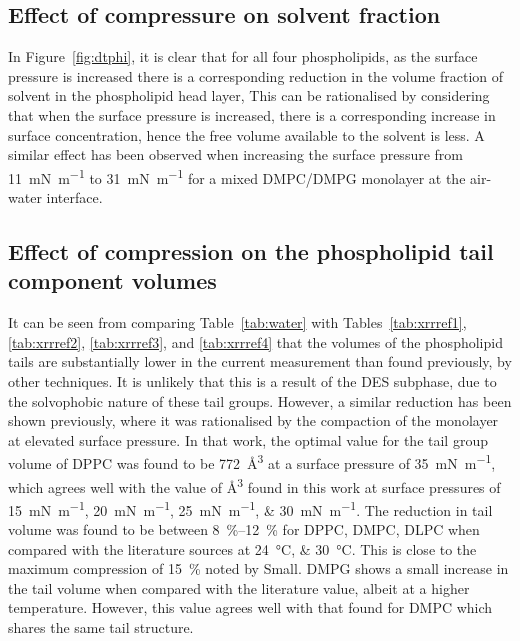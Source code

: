 \subsection{Effect of compressure on solvent fraction}
In Figure~\ref{fig:dtphi}, it is clear that for all four phospholipids, as the surface pressure is increased there is a corresponding reduction in the volume fraction of solvent in the phospholipid head layer,
This can be rationalised by considering that when the surface pressure is increased, there is a corresponding increase in surface concentration, hence the free volume available to the solvent is less.
A similar effect has been observed when increasing the surface pressure from \SI{11}{\milli\newton\per\meter} to \SI{31}{\milli\newton\per\meter} for a mixed DMPC/DMPG monolayer at the air-water interface.\autocite{bayerl_specular_1990}

\subsection{Effect of compression on the phospholipid tail component volumes}
It can be seen from comparing Table~\ref{tab:water} with Tables~\ref{tab:xrrref1}, \ref{tab:xrrref2}, \ref{tab:xrrref3}, and \ref{tab:xrrref4} that the volumes of the phospholipid tails are substantially lower in the current measurement than found previously, by other techniques.
It is unlikely that this is a result of the DES subphase, due to the solvophobic nature of these tail groups.
However, a similar reduction has been shown previously,\autocite{campbell_structure_2018} where it was rationalised by the compaction of the monolayer at elevated surface pressure.
In that work, the optimal value for the tail group volume of DPPC was found to be \SI{772}{\angstrom\cubed} at a surface pressure of \SI{35}{\milli\newton\per\meter}, which agrees well with the value of \si{\angstrom\cubed} found in this work at surface pressures of \SIlist{15;20;25;30}{\milli\newton\per\meter}.
The reduction in tail volume was found to be between \SIrange{8}{12}{\percent} for DPPC, DMPC, DLPC when compared with the literature sources at \SIlist{24;30}{\celsius}.
This is close to the maximum compression of \SI{15}{\percent} noted by Small.\autocite{small_lateral_1984}
DMPG shows a small increase in the tail volume when compared with the literature value, albeit at a higher temperature.
However, this value agrees well with that found for DMPC which shares the same tail structure.

